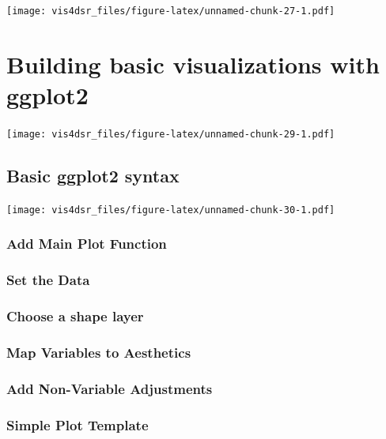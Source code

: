 \documentclass[
]{krantz}
\begin{document}
\texttt{[image: vis4dsr\_files/figure-latex/unnamed-chunk-27-1.pdf]}

\hypertarget{building-basic-visualizations}{%
\chapter{Building basic visualizations with ggplot2}\label{building-basic-visualizations}}

\texttt{[image: vis4dsr\_files/figure-latex/unnamed-chunk-29-1.pdf]}

\hypertarget{basic-ggplot2-syntax}{%
\section{Basic ggplot2 syntax}\label{basic-ggplot2-syntax}}

\texttt{[image: vis4dsr\_files/figure-latex/unnamed-chunk-30-1.pdf]}

\hypertarget{add-main-plot-function}{%
\subsection{Add Main Plot Function}\label{add-main-plot-function}}

\hypertarget{set-the-data}{%
\subsection{Set the Data}\label{set-the-data}}

\hypertarget{choose-a-shape-layer}{%
\subsection{Choose a shape layer}\label{choose-a-shape-layer}}

\hypertarget{map-variables-to-aesthetics}{%
\subsection{Map Variables to Aesthetics}\label{map-variables-to-aesthetics}}

\hypertarget{add-non-variable-adjustments}{%
\subsection{Add Non-Variable Adjustments}\label{add-non-variable-adjustments}}

\hypertarget{simple-plot-template}{%
\subsection{Simple Plot Template}\label{simple-plot-template}}
\end{document}
